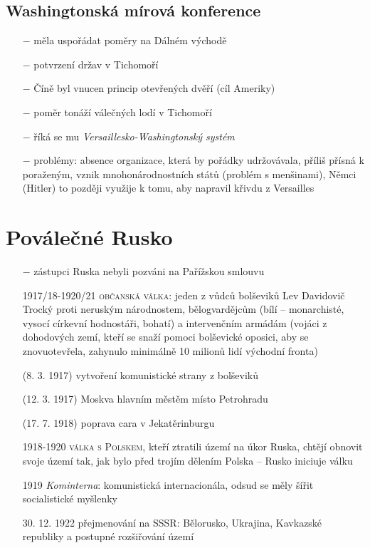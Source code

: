 \documentclass{article}
\begin{document}
\subsection*{Washingtonská mírová konference}
\begin{itemize}
    \vspace{-0.5em}
    \setlength\itemsep{0.15em}
    \item[$-$] měla uspořádat poměry na Dálném východě
    \item[$-$] potvrzení držav v Tichomoří
    \item[$-$] Číně byl vnucen princip otevřených dvěří (cíl Ameriky)
    \item[$-$] poměr tonáží válečných lodí v Tichomoří
    \item[$-$] říká se mu \textit{Versaillesko-Washingtonský systém}
    \item[$-$] problémy: absence organizace, která by pořádky udržovávala, příliš přísná k poraženým, vznik mnohonárodnostních států (problém s menšinami), Němci (Hitler) to později využije k tomu, aby napravil křivdu z Versailles
\end{itemize}

\section*{Poválečné Rusko}

\begin{itemize}
    \vspace{-0.5em}
    \setlength\itemsep{0.15em}
    \item[$-$] zástupci Ruska nebyli pozváni na Pařížskou smlouvu
    \item[1917/18-1920/21] \textsc{občanská válka}: jeden z vůdců bolševiků Lev Davidovič Trocký proti neruským národnostem, bělogvardějcům (bílí -- monarchisté, vysocí církevní hodnostáři, bohatí) a intervenčním armádám (vojáci z dohodových zemí, kteří se snaží pomoci bolševické oposici, aby se znovuotevřela, zahynulo minimálně 10 milionů lidí východní fronta)
    \item[(8. 3. 1917)] vytvoření komunistické strany z bolševiků
    \item[(12. 3. 1917)] Moskva hlavním městěm místo Petrohradu
    \item[(17. 7. 1918)] poprava cara v Jekatěrinburgu
    \item[1918-1920] \textsc{válka s Polskem}, kteří ztratili území na úkor Ruska, chtějí obnovit svoje území tak, jak bylo před trojím dělením Polska -- Rusko iniciuje válku
    \item[1919] \textit{Kominterna}: komunistická internacionála, odsud se měly šířit socialistické myšlenky
    \item[30. 12. 1922] přejmenování na SSSR: Bělorusko, Ukrajina, Kavkazské republiky a postupné rozšiřování území
\end{itemize}
\end{document}
